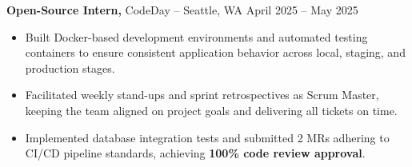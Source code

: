 \documentclass[11pt]{article}
\begin{document}
\textbf{Open-Source Intern,} {CodeDay} -- Seattle, WA \hfill April 2025 -- May 2025 \\
\vspace{-9pt}
\begin{itemize}
  \item Built Docker-based development environments and automated testing containers to ensure consistent application behavior across local, staging, and production stages.
  \item Facilitated weekly stand-ups and sprint retrospectives as Scrum Master, keeping the team aligned on project goals and delivering all tickets on time.
  \item Implemented database integration tests and submitted 2 MRs adhering to CI/CD pipeline standards, achieving \textbf{100\% code review approval}.
\end{itemize}

\end{document}
